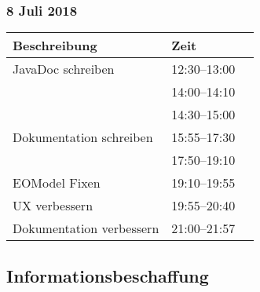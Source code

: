 \documentclass[a4paper, 11pt]{article}
\begin{document}
\subsubsection{8 Juli 2018}

\begin{tabular}{llr}
\toprule
Beschreibung & Zeit \\
\midrule
JavaDoc schreiben & 12:30--13:00 \\
 & 14:00--14:10 \\
 & 14:30--15:00\\
Dokumentation schreiben & 15:55--17:30 \\
 & 17:50--19:10 \\
EOModel Fixen & 19:10--19:55 \\
UX verbessern & 19:55--20:40 \\
Dokumentation verbessern & 21:00--21:57 \\
\bottomrule
\end{tabular}

\subsection{Informationsbeschaffung}
\end{document}
